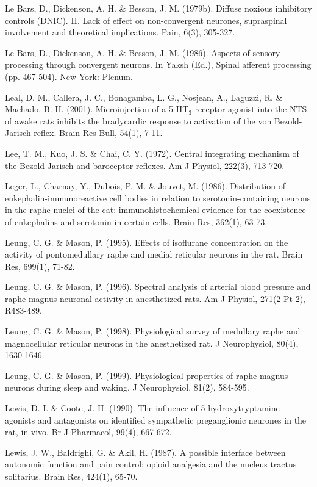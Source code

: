\documentclass[a4paper,12pt,twoside]{report}
\begin{document}
\begin{singlespacing}
\begin{footnotesize}
Le Bars, D., Dickenson, A. H. \& Besson, J. M. (1979b). Diffuse noxious inhibitory controls (DNIC). II. Lack of effect on non-convergent neurones, supraspinal involvement and theoretical implications. Pain, 6(3), 305-327.

Le Bars, D., Dickenson, A. H. \& Besson, J. M. (1986). Aspects of sensory processing through convergent neurons. In Yaksh (Ed.), Spinal afferent processing (pp. 467-504). New York: Plenum.

Leal, D. M., Callera, J. C., Bonagamba, L. G., Nosjean, A., Laguzzi, R. \& Machado, B. H. (2001). Microinjection of a 5-HT$_{3}$ receptor agonist into the NTS of awake rats inhibits the bradycardic response to activation of the von Bezold-Jarisch reflex. Brain Res Bull, 54(1), 7-11.

Lee, T. M., Kuo, J. S. \& Chai, C. Y. (1972). Central integrating mechanism of the Bezold-Jarisch and baroceptor reflexes. Am J Physiol, 222(3), 713-720.

Leger, L., Charnay, Y., Dubois, P. M. \& Jouvet, M. (1986). Distribution of enkephalin-immunoreactive cell bodies in relation to serotonin-containing neurons in the raphe nuclei of the cat: immunohistochemical evidence for the coexistence of enkephalins and serotonin in certain cells. Brain Res, 362(1), 63-73.

Leung, C. G. \& Mason, P. (1995). Effects of isoflurane concentration on the activity of pontomedullary raphe and medial reticular neurons in the rat. Brain Res, 699(1), 71-82.

Leung, C. G. \& Mason, P. (1996). Spectral analysis of arterial blood pressure and raphe magnus neuronal activity in anesthetized rats. Am J Physiol, 271(2 Pt 2), R483-489.

Leung, C. G. \& Mason, P. (1998). Physiological survey of medullary raphe and magnocellular reticular neurons in the anesthetized rat. J Neurophysiol, 80(4), 1630-1646.

Leung, C. G. \& Mason, P. (1999). Physiological properties of raphe magnus neurons during sleep and waking. J Neurophysiol, 81(2), 584-595.

Lewis, D. I. \& Coote, J. H. (1990). The influence of 5-hydroxytryptamine agonists and antagonists on identified sympathetic preganglionic neurones in the rat, in vivo. Br J Pharmacol, 99(4), 667-672.

Lewis, J. W., Baldrighi, G. \& Akil, H. (1987). A possible interface between autonomic function and pain control: opioid analgesia and the nucleus tractus solitarius. Brain Res, 424(1), 65-70.


\end{footnotesize}
\end{singlespacing}
\end{document}
